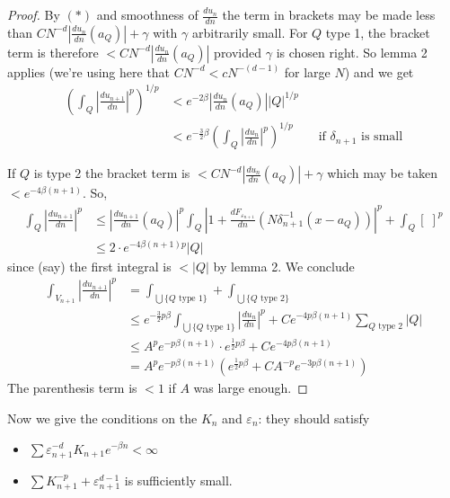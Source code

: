 \documentclass[11pt,reqno]{amsart}
\newcommand{\dn}[1]{\frac{d#1}{dn}}
\begin{document}
\begin{proof}
By $(*)$ and smoothness of $\dn{u_n}$ the term in brackets may be made less than
$C N^{-d}\left|\dn{u_n}(a_Q)\right|+\gamma$ with $\gamma$ arbitrarily small.  For
$Q$ type 1, the bracket term is therefore
$<C N^{-d}\left|\dn{u_n}(a_Q)\right|$ provided $\gamma$ is chosen right.  So lemma
2 applies (we're using here that $C N^{-d}<c N^{-(d-1)}$ for large $N$) and we get
\begin{align*}
 \left(\int_Q\left|\dn{u_{n+1}}\right|^{p}\right)^{1/p}
 &<e^{-2\beta}\left|\dn{u_n}(a_Q)\right||Q|^{1/p}\\
 &<e^{-\frac32\beta}\left(\int_Q\left|\dn{u_n}\right|^{p}\right)^{1/p}
   \qquad\text{if }\delta_{n+1}\text{ is small}
\end{align*}

If $Q$ is type 2 the bracket term is
$<C N^{-d}\left|\dn{u_n}(a_Q)\right|+\gamma$ which may be taken
$<e^{-4\beta(n+1)}$.  So,
\begin{align*}
 \int_Q\left|\dn{u_{n+1}}\right|^{p}
 &\leq\left|\dn{u_{n+1}}(a_Q)\right|^{p}
   \int_Q\left|1+\dn{F_{\varepsilon_{n+1}}}\!\left(N\delta_{n+1}^{-1}(x-a_Q)\right)\right|^{p}
   +\int_Q[\;]^{p}\\
 &\leq 2\cdot e^{-4\beta(n+1)p}|Q|
\end{align*}
since (say) the first integral is $<|Q|$ by lemma 2.  We conclude
\begin{align*}
 \int_{V_{n+1}}\left|\dn{u_{n+1}}\right|^{p}
 &=\int_{\bigcup\{Q\text{ type }1\}}+\int_{\bigcup\{Q\text{ type }2\}}\\
 &\leq e^{-\frac32 p\beta}\int_{\bigcup\{Q\text{ type }1\}}\left|\dn{u_n}\right|^{p}
   +C e^{-4p\beta(n+1)}\sum_{Q\text{ type }2}|Q|\\
 &\leq A^{p}e^{-p\beta(n+1)}\cdot e^{\frac12 p\beta}+C e^{-4p\beta(n+1)}\\
 &=A^{p}e^{-p\beta(n+1)}\left(e^{\frac12 p\beta}+C A^{-p}e^{-3p\beta(n+1)}\right)
\end{align*}
The parenthesis term is $<1$ if $A$ was large enough.
\end{proof}

Now we give the conditions on the $K_n$ and $\varepsilon_n$: they should satisfy
\begin{itemize}
\item[(1)] $\sum\varepsilon_{n+1}^{-d}K_{n+1}e^{-\beta n}<\infty$
\item[(2)] $\sum K_{n+1}^{-p}+\varepsilon_{n+1}^{d-1}$ is sufficiently small.
\end{itemize}
\end{document}
